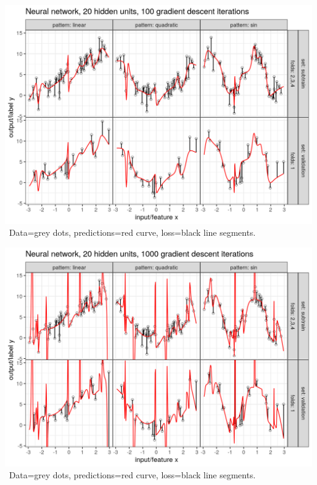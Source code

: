 \begin{frame}
  \includegraphics[width=\textwidth]{figure-overfitting-pred-units=20-maxit=100.png}
\ Data=grey dots, predictions=red curve, loss=black line segments.

\end{frame}


\begin{frame}
  \includegraphics[width=\textwidth]{figure-overfitting-pred-units=20-maxit=1000.png}
\ Data=grey dots, predictions=red curve, loss=black line segments.

\end{frame}


